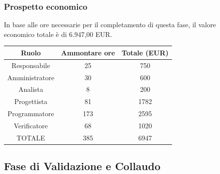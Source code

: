 \subsubsection{Prospetto economico}
In base alle ore necessarie per il completamento di questa fase, il valore economico totale è di 6.947,00 EUR.
\begin{center}
\begin{tabular}{ |c|c|c|  }
 \hline
 Ruolo 		& Ammontare ore 	& Totale (EUR)\\
 	\hline
 \hline
 	Responsabile	& 25 		& 750\\
	Amministratore	& 30		& 600\\
	Analista		& 8 	& 200\\
	Progettista		& 81		& 1782\\
	Programmatore	& 173		&2595 \\
	Verificatore	& 68 	& 1020\\
 \hline\hline
 TOTALE		& 385		& 6947\\
  \hline
\end{tabular}
\end{center}
\newpage
\subsection{Fase di Validazione e Collaudo}
